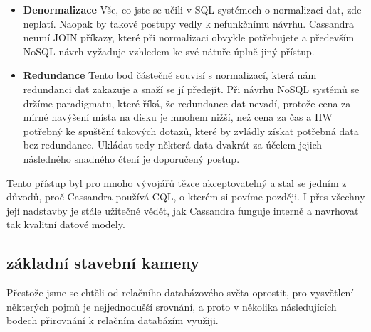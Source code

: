 \begin{itemize}
\item \textbf{Denormalizace} Vše, co jste se učili v SQL systémech o normalizaci dat, zde neplatí. Naopak by takové postupy vedly k nefunkčnímu návrhu. Cassandra neumí JOIN příkazy, které při normalizaci obvykle potřebujete a především NoSQL návrh vyžaduje vzhledem ke své nátuře úplně jiný přístup. 
\item \textbf{Redundance} Tento bod částečně souvisí s normalizací, která nám redundanci dat zakazuje a snaží se jí předejít. Při návrhu NoSQL systémů se držíme paradigmatu, které říká, že redundance dat nevadí, protože cena za mírné navýšení místa na disku je mnohem nižší, než cena za čas a HW potřebný ke spuštění takových dotazů, které by zvládly získat potřebná data bez redundance. Ukládat tedy některá data dvakrát za účelem jejich následného snadného čtení je doporučený postup. 
\end{itemize}

Tento přístup byl pro mnoho vývojářů tězce akceptovatelný a stal se jedním z důvodů, proč Cassandra používá CQL, o kterém si povíme později. I přes všechny její nadstavby je stále užitečné vědět, jak Cassandra funguje interně a navrhovat tak kvalitní datové modely. 

\subsection{základní stavební kameny}
Přestože jsme se chtěli od relačního databázového světa oprostit, pro vysvětlení některých pojmů je nejjednodušší srovnání, a proto v několika následujících bodech přirovnání k relačním databázím využiji.


